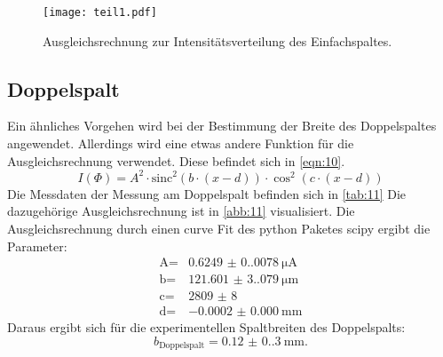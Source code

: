 \label{sec:Auswertung}
\begin{figure}[H]    
    \centering
    \caption{Ausgleichsrechnung zur Intensitätsverteilung des Einfachspaltes.}
    \label{abb:10}
    \texttt{[image: teil1.pdf]}
\end{figure}





\subsection{Doppelspalt}
Ein ähnliches Vorgehen wird bei der Bestimmung der Breite des Doppelspaltes
angewendet. Allerdings wird eine etwas andere Funktion für die Ausgleichsrechnung
verwendet. Diese befindet sich in \autoref{eqn:10}.
\begin{equation}
    \label{eqn:10}
    I\left(\Phi\right) = A^2 \cdot \text{sinc}^2\left(b \cdot \left(x - d\right)\right)  \cdot \cos^2{\left(c \cdot \left(x - d\right)\right)}
\end{equation}
\noindent Die Messdaten der Messung am Doppelspalt befinden sich in \autoref{tab:11}
Die dazugehörige Ausgleichsrechnung ist in \autoref{abb:11} visualisiert.
Die Ausgleichsrechnung durch einen curve Fit des python Paketes scipy ergibt
die Parameter:
\begin{align}
    \text{A} = & \qty{0.6249(0.0078)}{\micro\ampere} \\
    \text{b} = & \qty{121.601(3.079)}{\micro\meter}\\
    \text{c} = & \qty{2809(8)}{} \\
    \text{d} = & \qty{-0.0002(0)}{\milli\meter}
\end{align}
\noindent Daraus ergibt sich für die experimentellen Spaltbreiten des Doppelspalts:
\begin{equation}
    b_\text{Doppelspalt} = \qty{0.12(0.30)}{\milli\meter}.
\end{equation}
\noindent
